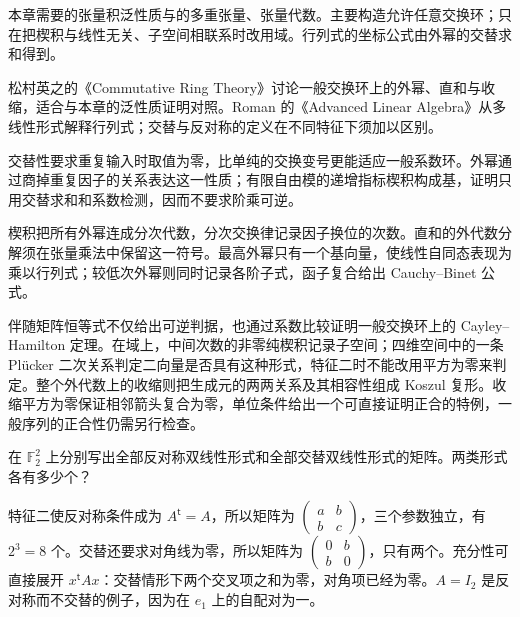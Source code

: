 本章需要的张量积泛性质与的多重张量、张量代数。主要构造允许任意交换环；只在把楔积与线性无关、子空间相联系时改用域。行列式的坐标公式由外幂的交替求和得到。

\ProseParagraphBreak
松村英之的《Commutative Ring Theory》\cite[Appendix C, (1)--(6), pp. 283--286]{Matsumura1989CommutativeRingTheory}讨论一般交换环上的外幂、直和与收缩，适合与本章的泛性质证明对照。Roman 的《Advanced Linear Algebra》\cite[Chapter 14, The Determinant, pp. 403--405]{Roman2008AdvancedLinearAlgebra}从多线性形式解释行列式；交替与反对称的定义在不同特征下须加以区别。






\begin{chaptersummary}
	交替性要求重复输入时取值为零，比单纯的交换变号更能适应一般系数环。外幂通过商掉重复因子的关系表达这一性质；有限自由模的递增指标楔积构成基，证明只用交替求和和系数检测，因而不要求阶乘可逆。

	\ProseParagraphBreak
	楔积把所有外幂连成分次代数，分次交换律记录因子换位的次数。直和的外代数分解须在张量乘法中保留这一符号。最高外幂只有一个基向量，使线性自同态表现为乘以行列式；较低次外幂则同时记录各阶子式，函子复合给出 Cauchy–Binet 公式。

	\ProseParagraphBreak
	伴随矩阵恒等式不仅给出可逆判据，也通过系数比较证明一般交换环上的 Cayley–Hamilton 定理。在域上，中间次数的非零纯楔积记录子空间；四维空间中的一条 Plücker 二次关系判定二向量是否具有这种形式，特征二时不能改用平方为零来判定。整个外代数上的收缩则把生成元的两两关系及其相容性组成 Koszul 复形。收缩平方为零保证相邻箭头复合为零，单位条件给出一个可直接证明正合的特例，一般序列的正合性仍需另行检查。
\end{chaptersummary}

\BookExercises

\begin{exercise}\label{b2:ex:09-alternating-characteristic-two}
	在 \(\mathbb F_2^2\) 上分别写出全部反对称双线性形式和全部交替双线性形式的矩阵。两类形式各有多少个？
\end{exercise}
\begin{solution}
	特征二使反对称条件成为 \(A^{\mathsf t}=A\)，所以矩阵为 \(\begin{pmatrix}a&b\\b&c\end{pmatrix}\)，三个参数独立，有 \(2^3=8\) 个。交替还要求对角线为零，所以矩阵为 \(\begin{pmatrix}0&b\\b&0\end{pmatrix}\)，只有两个。充分性可直接展开 \(x^{\mathsf t}Ax\)：交替情形下两个交叉项之和为零，对角项已经为零。\(A=I_2\) 是反对称而不交替的例子，因为在 \(e_1\) 上的自配对为一。
\end{solution}


